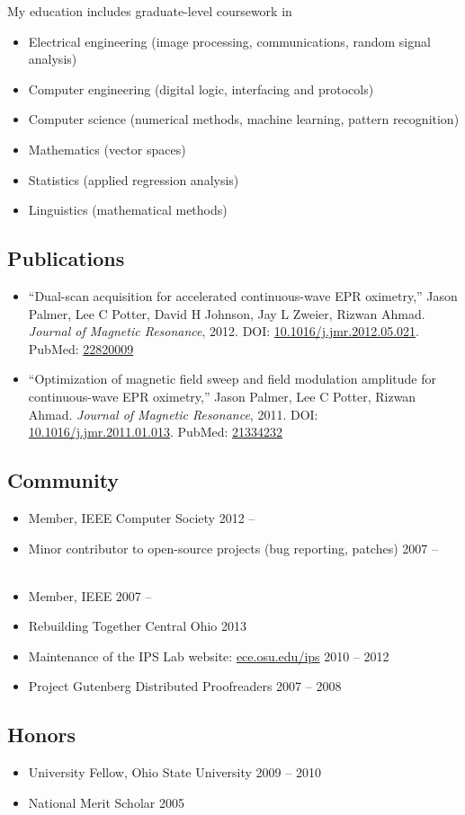 \documentclass[12pt]{report}
\begin{document}
My education includes graduate-level coursework in
\begin{itemize}
\item Electrical engineering (image processing, communications, random signal analysis)
\item Computer engineering (digital logic, interfacing and protocols)
\item Computer science (numerical methods, machine learning, pattern recognition)
\item Mathematics (vector spaces)
\item Statistics (applied regression analysis)
\item Linguistics (mathematical methods)
\end{itemize}

\subsection*{Publications}
\begin{itemize}
\item ``Dual-scan acquisition for accelerated continuous-wave EPR oximetry,''
Jason Palmer, Lee C Potter, David H Johnson, Jay L Zweier, Rizwan Ahmad.
{\it Journal of Magnetic Resonance}, 2012.
DOI: \href{http://dx.doi.org/10.1016/j.jmr.2012.05.021}{10.1016/j.jmr.2012.05.021}.
PubMed: \href{http://www.ncbi.nlm.nih.gov/pubmed/22820009}{22820009}
\item ``Optimization of magnetic field sweep and field modulation amplitude for continuous-wave EPR oximetry,''
Jason Palmer, Lee C Potter, Rizwan Ahmad.
{\it Journal of Magnetic Resonance}, 2011.
DOI: \href{http://dx.doi.org/10.1016/j.jmr.2011.01.013}{10.1016/j.jmr.2011.01.013}.
PubMed: \href{http://www.ncbi.nlm.nih.gov/pubmed/21334232}{21334232}
\end{itemize}

\subsection*{Community}
\begin{itemize}
\item Member, IEEE Computer Society                                                      \hfill 2012 -- ~~~~~~~
\item Minor contributor to open-source projects (bug reporting, patches)                 \hfill 2007 -- ~~~~~~~
\item Member, IEEE                                                                       \hfill 2007 -- ~~~~~~~
\item Rebuilding Together Central Ohio                                                   \hfill 2013
\item Maintenance of the IPS Lab website: \href{http://ece.osu.edu/ips}{ece.osu.edu/ips} \hfill 2010 -- 2012
\item Project Gutenberg Distributed Proofreaders                                         \hfill 2007 -- 2008
\end{itemize}

\subsection*{Honors}
\begin{itemize}
\item University Fellow, Ohio State University \hfill 2009 -- 2010
\item National Merit Scholar                   \hfill 2005
\end{itemize}
\end{document}
